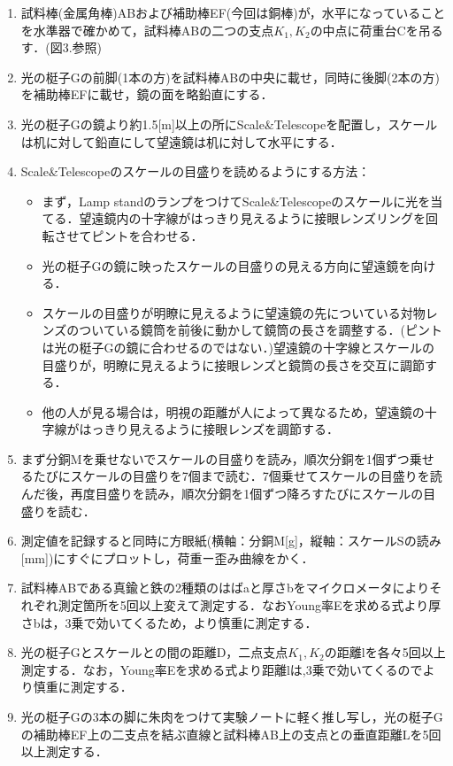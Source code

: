 \documentclass[a4paper,1pt]{jsarticle}
\begin{document}
\begin{enumerate}
  \item 試料棒(金属角棒)ABおよび補助棒EF(今回は銅棒)が，水平になっていることを水準器で確かめて，試料棒ABの二つの支点$K_1,K_2$の中点に荷重台Cを吊るす．(図3.参照)
  \item 光の梃子Gの前脚(1本の方)を試料棒ABの中央に載せ，同時に後脚(2本の方)を補助棒EFに載せ，鏡の面を略鉛直にする．
  \item 光の梃子Gの鏡より約1.5[m]以上の所にScale\&Telescopeを配置し，スケールは机に対して鉛直にして望遠鏡は机に対して水平にする．
  \item Scale\&Telescopeのスケールの目盛りを読めるようにする方法：
  \begin{itemize}
    \item まず，Lamp standのランプをつけてScale\&Telescopeのスケールに光を当てる．望遠鏡内の十字線がはっきり見えるように接眼レンズリングを回転させてピントを合わせる．
    \item 光の梃子Gの鏡に映ったスケールの目盛りの見える方向に望遠鏡を向ける．
    \item スケールの目盛りが明瞭に見えるように望遠鏡の先についている対物レンズのついている鏡筒を前後に動かして鏡筒の長さを調整する．(ピントは光の梃子Gの鏡に合わせるのではない．)望遠鏡の十字線とスケールの目盛りが，明瞭に見えるように接眼レンズと鏡筒の長さを交互に調節する．
    \item 他の人が見る場合は，明視の距離が人によって異なるため，望遠鏡の十字線がはっきり見えるように接眼レンズを調節する．
  \end{itemize}
  
  \item まず分銅Mを乗せないでスケールの目盛りを読み，順次分銅を1個ずつ乗せるたびにスケールの目盛りを7個まで読む．7個乗せてスケールの目盛りを読んだ後，再度目盛りを読み，順次分銅を1個ずつ降ろすたびにスケールの目盛りを読む．
  \item 測定値を記録すると同時に方眼紙(横軸：分銅M[g]，縦軸：スケールSの読み[mm])にすぐにプロットし，荷重ー歪み曲線をかく．
  \item 試料棒ABである真鍮と鉄の2種類のはばaと厚さbをマイクロメータによりそれぞれ測定箇所を5回以上変えて測定する．なおYoung率Eを求める式より厚さbは，3乗で効いてくるため，より慎重に測定する．
  \item 光の梃子Gとスケールとの間の距離D，二点支点$K_1,K_2$の距離lを各々5回以上測定する．なお，Young率Eを求める式より距離lは,3乗で効いてくるのでより慎重に測定する．
  \item 光の梃子Gの3本の脚に朱肉をつけて実験ノートに軽く推し写し，光の梃子Gの補助棒EF上の二支点を結ぶ直線と試料棒AB上の支点との垂直距離Lを5回以上測定する．
\end{enumerate}
\end{document}
